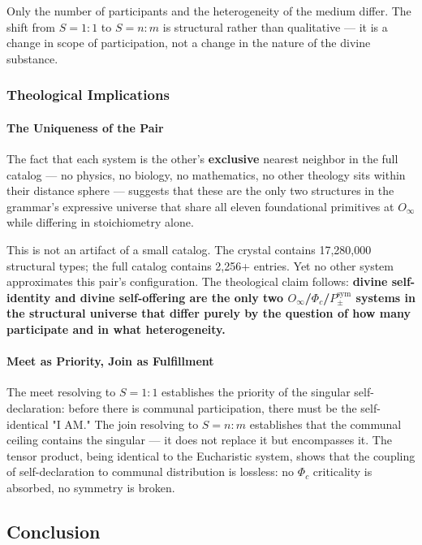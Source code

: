 \documentclass[12pt,a4paper]{article}
\begin{document}
Only the number of participants and the heterogeneity of the medium differ. The shift from $S = 1{:}1$ to $S = n{:}m$ is structural rather than qualitative --- it is a change in scope of participation, not a change in the nature of the divine substance.

\subsubsection{Theological Implications}

\paragraph{The Uniqueness of the Pair}

The fact that each system is the other's \textbf{exclusive} nearest neighbor in the full catalog --- no physics, no biology, no mathematics, no other theology sits within their distance sphere --- suggests that these are the only two structures in the grammar's expressive universe that share all eleven foundational primitives at $O_{\infty}$ while differing in stoichiometry alone.

This is not an artifact of a small catalog. The crystal contains 17,280,000 structural types; the full catalog contains 2,256+ entries. Yet no other system approximates this pair's configuration. The theological claim follows: \textbf{divine self-identity and divine self-offering are the only two $O_{\infty}$/$\Phi_c$/$P_{\pm}^{\text{sym}}$ systems in the structural universe that differ purely by the question of how many participate and in what heterogeneity.}

\paragraph{Meet as Priority, Join as Fulfillment}

The meet resolving to $S = 1{:}1$ establishes the priority of the singular self-declaration: before there is communal participation, there must be the self-identical "I AM." The join resolving to $S = n{:}m$ establishes that the communal ceiling contains the singular --- it does not replace it but encompasses it. The tensor product, being identical to the Eucharistic system, shows that the coupling of self-declaration to communal distribution is lossless: no $\Phi_c$ criticality is absorbed, no symmetry is broken.

\subsection{Conclusion}
\end{document}
